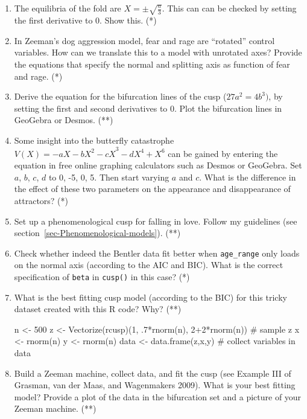 \documentclass[
  a4paper,
  DIV=11,
  numbers=noendperiod,
  oneside]{scrreprt}
\newenvironment{Shaded}{}{}
\newcommand{\CommentTok}[1]{\textcolor[rgb]{0.42,0.45,0.49}{#1}}
\newcommand{\DecValTok}[1]{\textcolor[rgb]{0.00,0.36,0.77}{#1}}
\newcommand{\FunctionTok}[1]{\textcolor[rgb]{0.44,0.26,0.76}{#1}}
\newcommand{\NormalTok}[1]{\textcolor[rgb]{0.14,0.16,0.18}{#1}}
\newcommand{\OtherTok}[1]{\textcolor[rgb]{0.44,0.26,0.76}{#1}}
\newcommand{\SpecialCharTok}[1]{\textcolor[rgb]{0.00,0.36,0.77}{#1}}
\begin{document}
\begin{enumerate}
\def\labelenumi{\arabic{enumi})}
\item
  The equilibria of the fold are \(X = \pm \sqrt{\frac{a}{3}}\). This
  can can be checked by setting the first derivative to 0. Show this.
  (*)
\item
  In Zeeman's dog aggression model, fear and rage are ``rotated''
  control variables. How can we translate this to a model with unrotated
  axes? Provide the equations that specify the normal and splitting axis
  as function of fear and rage. (*)
\item
  Derive the equation for the bifurcation lines of the cusp
  (\(27a^{2} = 4b^{3})\), by setting the first and second derivatives to
  0. Plot the bifurcation lines in GeoGebra or Desmos. (**)
\item
  Some insight into the butterfly catastrophe
  \(V(X) = {- aX - bX^{2} - cX}^{3} - dX^{4} + X^{6}\) can be gained by
  entering the equation in free online graphing calculators such as
  Desmos or GeoGebra. Set \(a\), \(b\), \(c\), \(d\) to 0, -5, 0, 5.
  Then start varying \(a\) and \(c\). What is the difference in the
  effect of these two parameters on the appearance and disappearance of
  attractors? (*)
\item
  Set up a phenomenological cusp for falling in love. Follow my
  guidelines (see section~\ref{sec-Phenomenological-models}). (**)
\item
  Check whether indeed the Bentler data fit better when
  \texttt{age\_range} only loads on the normal axis (according to the
  AIC and BIC). What is the correct specification of \texttt{beta} in
  \texttt{cusp()} in this case? (*)
\item
  What is the best fitting cusp model (according to the BIC) for this
  tricky dataset created with this R code? Why? (**)

\begin{Shaded}
\begin{Highlighting}[]
\NormalTok{n }\OtherTok{\textless{}{-}} \DecValTok{500}
\NormalTok{z }\OtherTok{\textless{}{-}} \FunctionTok{Vectorize}\NormalTok{(rcusp)(}\DecValTok{1}\NormalTok{, .}\DecValTok{7}\SpecialCharTok{*}\FunctionTok{rnorm}\NormalTok{(n), }\DecValTok{2}\SpecialCharTok{+}\DecValTok{2}\SpecialCharTok{*}\FunctionTok{rnorm}\NormalTok{(n)) }\CommentTok{\# sample z }
\NormalTok{x }\OtherTok{\textless{}{-}} \FunctionTok{rnorm}\NormalTok{(n) }
\NormalTok{y }\OtherTok{\textless{}{-}} \FunctionTok{rnorm}\NormalTok{(n) }
\NormalTok{data }\OtherTok{\textless{}{-}} \FunctionTok{data.frame}\NormalTok{(z,x,y) }\CommentTok{\# collect variables in data}
\end{Highlighting}
\end{Shaded}
\item
  Build a Zeeman machine, collect data, and fit the cusp (see Example
  III of Grasman, van der Maas, and Wagenmakers 2009). What is your best
  fitting model? Provide a plot of the data in the bifurcation set and a
  picture of your Zeeman machine. (**)
\end{enumerate}
\end{document}
